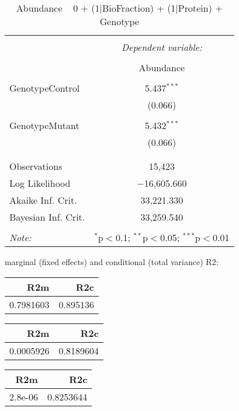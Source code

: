 \documentclass[11pt]{report}
\begin{document}
\begin{table}[!htbp] \centering 
  \caption{Abundance ~ 0 + (1|BioFraction) + (1|Protein) + Genotype} 
  \label{} 
\begin{tabular}{@{\extracolsep{5pt}}lc} 
\\[-1.8ex]\hline 
\hline \\[-1.8ex] 
 & \multicolumn{1}{c}{\textit{Dependent variable:}} \\ 
\cline{2-2} 
\\[-1.8ex] & Abundance \\ 
\hline \\[-1.8ex] 
 GenotypeControl & 5.437$^{***}$ \\ 
  & (0.066) \\ 
  & \\ 
 GenotypeMutant & 5.432$^{***}$ \\ 
  & (0.066) \\ 
  & \\ 
\hline \\[-1.8ex] 
Observations & 15,423 \\ 
Log Likelihood & $-$16,605.660 \\ 
Akaike Inf. Crit. & 33,221.330 \\ 
Bayesian Inf. Crit. & 33,259.540 \\ 
\hline 
\hline \\[-1.8ex] 
\textit{Note:}  & \multicolumn{1}{r}{$^{*}$p$<$0.1; $^{**}$p$<$0.05; $^{***}$p$<$0.01} \\ 
\end{tabular} 
\end{table} 
marginal (fixed effects) and conditional (total variance) R2:

\begin{tabular}{r|r}
\hline
R2m & R2c\\
\hline
0.7981603 & 0.895136\\
\hline
\end{tabular}

\begin{tabular}{r|r}
\hline
R2m & R2c\\
\hline
0.0005926 & 0.8189604\\
\hline
\end{tabular}

\begin{tabular}{r|r}
\hline
R2m & R2c\\
\hline
2.8e-06 & 0.8253644\\
\hline
\end{tabular}
\end{document}
